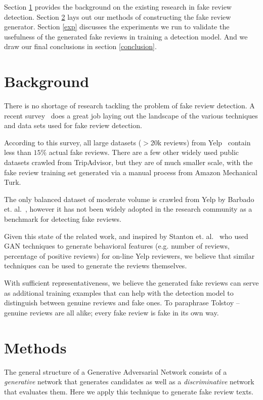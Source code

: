 \documentclass[conference]{IEEEtran} %
\theoremstyle{plain}
\theoremstyle{definition}
\begin{document}
Section \ref{bg} provides the background on the existing research in fake review detection. Section \ref{methods} lays out our methods of constructing the fake review generator. Section \ref{exp} discusses the experiments we run to validate the usefulness of the generated fake reviews in training a detection model. And we draw our final conclusions in section \ref{conclusion}.


\section{Background}
\label{bg}
There is no shortage of research tackling the problem of fake review detection. A recent survey~\cite{Mohawesh2021} does a great job laying out the landscape of the various techniques and data sets used for fake review detection.

According to this survey, all large datasets ($>$20k reviews) from Yelp~\cite{rayana2015collective} contain less than $15\%$ actual fake reviews. There are a few other widely used public datasets crawled from TripAdvisor, but they are of much smaller scale, with the fake review training set generated via a manual process from Amazon Mechanical Turk.

The only balanced dataset of moderate volume is crawled from Yelp by Barbado et. al.~\cite{barbado2019framework}, however it has not been widely adopted in the research community as a benchmark for detecting fake reviews.

Given this state of the related work, and inspired by Stanton et. al.~\cite{stanton2019gans} who used GAN techniques to generate behavioral features (e.g. number of reviews, percentage of positive reviews) for on-line Yelp reviewers, we believe that similar techniques can be used to generate the reviews themselves.

With sufficient representativeness, we believe the generated fake reviews can serve as additional training examples that can help with the detection model to distinguish between genuine reviews and fake ones. To paraphrase Tolstoy --  genuine reviews are all alike; every fake review is fake in its own way.



\section{Methods}
\label{methods}
The general structure of a Generative Adversarial Network consists of a \textit{generative} network that generates candidates as well as a \textit{discriminative} network that evaluates them. Here we apply this technique to generate fake review texts.
\end{document}
